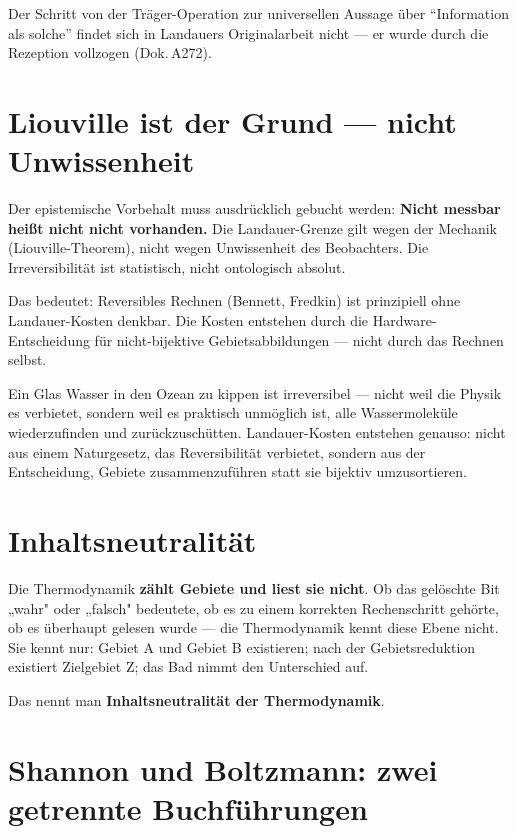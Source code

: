 Der Schritt von der Träger-Operation zur universellen Aussage über
\enquote{Information als solche} findet sich in Landauers Originalarbeit
nicht --- er wurde durch die Rezeption vollzogen (Dok.\,A272).

\section{Liouville ist der Grund --- nicht Unwissenheit}

Der epistemische Vorbehalt muss ausdrücklich gebucht werden:
\textbf{Nicht messbar heißt nicht nicht vorhanden.} Die Landauer-Grenze
gilt wegen der Mechanik (Liouville-Theorem), nicht wegen Unwissenheit des
Beobachters. Die Irreversibilität ist statistisch, nicht ontologisch
absolut. 

Das bedeutet: Reversibles Rechnen (Bennett, Fredkin) ist prinzipiell ohne
Landauer-Kosten denkbar. Die Kosten entstehen durch die Hardware-Entscheidung
für nicht-bijektive Gebietsabbildungen --- nicht durch das Rechnen selbst.

\begin{laierspur}
Ein Glas Wasser in den Ozean zu kippen ist irreversibel --- nicht weil
die Physik es verbietet, sondern weil es praktisch unmöglich ist, alle
Wassermoleküle wiederzufinden und zurückzuschütten. Landauer-Kosten
entstehen genauso: nicht aus einem Naturgesetz, das Reversibilität verbietet,
sondern aus der Entscheidung, Gebiete zusammenzuführen statt sie bijektiv
umzusortieren.
\end{laierspur}

\section{Inhaltsneutralität}

Die Thermodynamik \textbf{zählt Gebiete und liest sie nicht}. 
Ob das gelöschte Bit „wahr" oder „falsch" bedeutete, ob es zu einem
korrekten Rechenschritt gehörte, ob es überhaupt gelesen wurde --- die
Thermodynamik kennt diese Ebene nicht. Sie kennt nur: Gebiet A und Gebiet B
existieren; nach der Gebietsreduktion existiert Zielgebiet Z; das Bad nimmt
den Unterschied auf.

Das nennt man \textbf{Inhaltsneutralität der Thermodynamik}.

\section{Shannon und Boltzmann: zwei getrennte Buchführungen}

